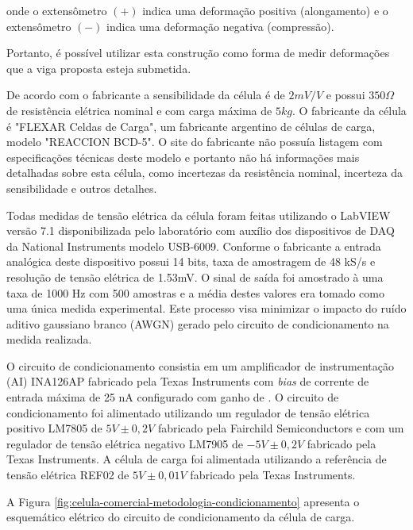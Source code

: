 \documentclass[a4paper]{instrumentacao}
\begin{document}
\noindent onde o extensômetro $(+)$ indica uma deformação positiva (alongamento) e o extensômetro $(-)$ indica uma deformação negativa (compressão).

Portanto, é possível utilizar esta construção como forma de medir deformações que a viga proposta esteja submetida.

De acordo com o fabricante a sensibilidade da célula é de $2 mV/V$ e possui $350 \Omega$ de resistência elétrica nominal e com carga máxima de $5 kg$.  O fabricante da célula é "FLEXAR Celdas de Carga", um fabricante argentino de células de carga, modelo "REACCION BCD-5". O site do fabricante não possuía listagem com especificações técnicas deste modelo e portanto não há informações mais detalhadas sobre esta célula, como incertezas da resistência nominal, incerteza da sensibilidade e outros detalhes.

Todas medidas de tensão elétrica da célula foram feitas utilizando o LabVIEW versão 7.1 disponibilizada pelo laboratório com auxílio dos dispositivos de DAQ da National Instruments modelo USB-6009. Conforme o fabricante \cite{daq-specifications} a entrada analógica deste dispositivo possui 14 bits, taxa de amostragem de 48 kS/s e resolução de tensão elétrica de 1.53mV. O sinal de saída foi amostrado à uma taxa de 1000 Hz com 500 amostras e a média destes valores era tomado como uma única medida experimental. Este processo visa minimizar o impacto do ruído aditivo gaussiano branco (AWGN) gerado pelo circuito de condicionamento na medida realizada.

O circuito de condicionamento consistia em um amplificador de instrumentação (AI) INA126AP fabricado pela Texas Instruments com \textit{bias} de corrente de entrada máxima de 25 nA \cite{datasheet-ina126} configurado com ganho de . O circuito de condicionamento foi alimentado utilizando um regulador de tensão elétrica positivo LM7805 de $5V \pm 0,2V$ \cite{datasheet-lm7805} fabricado pela Fairchild Semiconductors e com um regulador de tensão elétrica negativo LM7905 de $-5V \pm 0,2V$ \cite{datasheet-lm7905} fabricado pela Texas Instruments. A célula de carga foi alimentada utilizando a referência de tensão elétrica REF02 de $5V \pm 0,01V$ \cite{datasheet-ref02} fabricado pela Texas Instruments.

A Figura \ref{fig:celula-comercial-metodologia-condicionamento} apresenta o esquemático elétrico do circuito de condicionamento da célula de carga.
\end{document}
